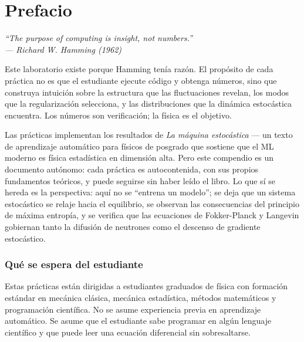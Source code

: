 \chapter*{Prefacio}

\begin{flushright}
\itshape
``The purpose of computing is insight, not numbers.''\\[2pt]
\upshape --- Richard W. Hamming (1962)
\end{flushright}
\bigskip

Este laboratorio existe porque Hamming tenía razón. El propósito de cada
práctica no es que el estudiante ejecute código y obtenga números, sino que
construya intuición sobre la estructura que las fluctuaciones revelan, los
modos que la regularización selecciona, y las distribuciones que la dinámica
estocástica encuentra. Los números son verificación; la física es el objetivo.

Las prácticas implementan los resultados de \textit{La máquina estocástica}
--- un texto de aprendizaje automático para físicos de posgrado que
sostiene que el ML moderno es física estadística en dimensión alta. Pero
este compendio es un documento autónomo: cada práctica es autocontenida,
con sus propios fundamentos teóricos, y puede seguirse sin haber leído
el libro. Lo que sí se hereda es la perspectiva: aquí no se ``entrena un
modelo''; se deja que un sistema estocástico se relaje hacia el equilibrio,
se observan las consecuencias del principio de máxima entropía, y se
verifica que las ecuaciones de Fokker-Planck y Langevin gobiernan tanto
la difusión de neutrones como el descenso de gradiente estocástico.

\subsection*{Qué se espera del estudiante}

Estas prácticas están dirigidas a estudiantes graduados de física con
formación estándar en mecánica clásica, mecánica estadística, métodos
matemáticos y programación científica. No se asume experiencia previa en
aprendizaje automático. Se asume que el estudiante sabe programar en algún
lenguaje científico y que puede leer una ecuación diferencial sin
sobresaltarse.

